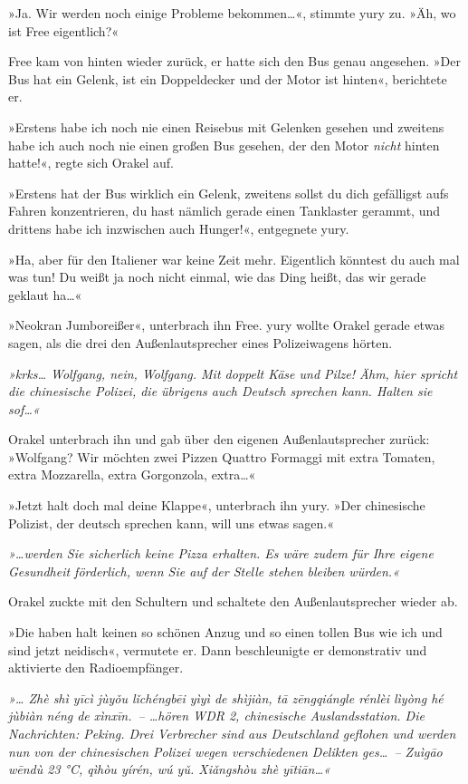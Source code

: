 »Ja. Wir werden noch einige Probleme bekommen…«, stimmte yury zu. »Äh, wo ist Free eigentlich?«

Free kam von hinten wieder zurück, er hatte sich den Bus genau angesehen. »Der Bus hat ein Gelenk, ist ein Doppeldecker und der Motor ist hinten«, berichtete er.

»Erstens habe ich noch nie einen Reisebus mit Gelenken gesehen und zweitens habe ich auch noch nie einen großen Bus gesehen, der den Motor \textit{nicht} hinten hatte!«, regte sich Orakel auf.

»Erstens hat der Bus wirklich ein Gelenk, zweitens sollst du dich gefälligst aufs Fahren konzentrieren, du hast nämlich gerade einen Tanklaster gerammt, und drittens habe ich inzwischen auch Hunger!«, entgegnete yury.

»Ha, aber für den Italiener war keine Zeit mehr. Eigentlich könntest du auch mal was tun! Du weißt ja noch nicht einmal, wie das Ding heißt, das wir gerade geklaut ha…«

»Neokran Jumboreißer«, unterbrach ihn Free. yury wollte Orakel gerade etwas sagen, als die drei den Außenlautsprecher eines Polizeiwagens hörten.

\textit{»krks… Wolfgang, nein, Wolfgang. Mit doppelt Käse und  Pilze! Ähm, hier spricht die chinesische Polizei, die übrigens auch Deutsch sprechen kann. Halten sie sof…«}

Orakel unterbrach ihn und gab über den eigenen Außenlautsprecher zurück: »Wolfgang? Wir möchten zwei Pizzen Quattro Formaggi mit extra Tomaten, extra Mozzarella, extra Gorgonzola, extra…«

»Jetzt halt doch mal deine Klappe«, unterbrach ihn yury. »Der chinesische Polizist, der deutsch sprechen kann, will uns etwas sagen.«

\textit{»…werden Sie sicherlich keine Pizza erhalten. Es wäre zudem für Ihre eigene Gesundheit förderlich, wenn Sie auf der Stelle stehen bleiben würden.«}

Orakel zuckte mit den Schultern und schaltete den Außenlautsprecher wieder ab.

»Die haben halt keinen so schönen Anzug und so einen tollen Bus wie ich und sind jetzt neidisch«, vermutete er. Dann beschleunigte er demonstrativ und aktivierte den Radioempfänger.

\textit{»… Zhè shì yīcì jùyǒu lǐchéngbēi yìyì de shìjiàn, tā zēngqiángle rénlèi lìyòng hé jùbiàn néng de xìnxīn.~– …hören WDR 2, chinesische Auslandsstation. Die Nachrichten: Peking. Drei Verbrecher sind aus Deutschland geflohen und werden nun von der chinesischen Polizei wegen verschiedenen Delikten ges…~– Zuìgāo wēndù 23  °C, qìhòu yírén, wú yǔ. Xiǎngshòu zhè yītiān…«}

